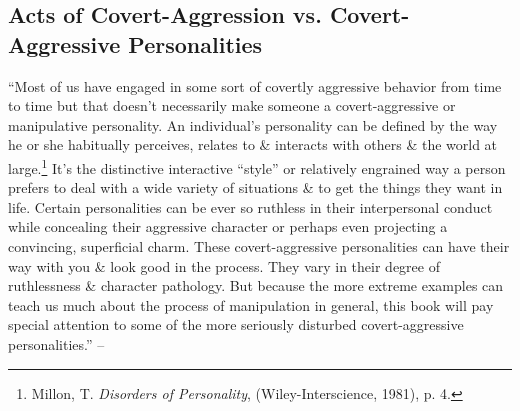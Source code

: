 \documentclass{article}
\numberwithin{equation}{section}
\begin{document}
\subsection{Acts of Covert-Aggression vs. Covert-Aggressive Personalities}
``Most of us have engaged in some sort of covertly aggressive behavior from time to time but that doesn't necessarily make someone a covert-aggressive or manipulative personality. An individual's personality can be defined by the way he or she habitually perceives, relates to \& interacts with others \& the world at large.\footnote{Millon, T. \textit{Disorders of Personality}, (Wiley-Interscience, 1981), p. 4.} It's the distinctive interactive ``style'' or relatively engrained way a person prefers to deal with a wide variety of situations \& to get the things they want in life. Certain personalities can be ever so ruthless in their interpersonal conduct while concealing their aggressive character or perhaps even projecting a convincing, superficial charm. These covert-aggressive personalities can have their way with you \& look good in the process. They vary in their degree of ruthlessness \& character pathology. But because the more extreme examples can teach us much about the process of manipulation in general, this book will pay special attention to some of the more seriously disturbed covert-aggressive personalities.'' -- \cite[pp. 21--22]{Simon2010}
\end{document}
